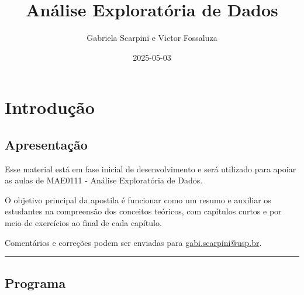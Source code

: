 \documentclass[
]{book}
\title{Análise Exploratória de Dados}
\author{Gabriela Scarpini e Victor Fossaluza}
\date{2025-05-03}
\begin{document}
\maketitle

{
\setcounter{tocdepth}{1}
\tableofcontents
}
\chapter{Introdução}\label{intro}

\section{Apresentação}\label{apresentauxe7uxe3o}

Esse material está em fase inicial de desenvolvimento e será utilizado para apoiar as aulas de MAE0111 - Análise Exploratória de Dados.

O objetivo principal da apostila é funcionar como um resumo e auxiliar os estudantes na compreensão dos conceitos teóricos, com capítulos curtos e por meio de exercícios ao final de cada capítulo.

Comentários e correções podem ser enviadas para \url{gabi.scarpini@usp.br}.

\begin{center}\rule{0.5\linewidth}{0.5pt}\end{center}

\section{Programa}\label{programa}
\end{document}

